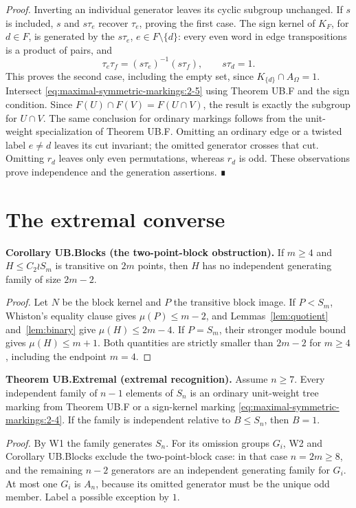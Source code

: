\emph{Proof.} Inverting an individual generator leaves its cyclic subgroup unchanged. If \(s\) is included, \(s\) and \(s\tau_e\) recover \(\tau_e\), proving the first case. The sign kernel of \(K_F\), for \(d\in F\), is generated by the \(s\tau_e\), \(e\in F\setminus\{d\}\): every even word in edge transpositions is a product of pairs, and \[
\tau_e\tau_f=(s\tau_e)^{-1}(s\tau_f),\qquad s\tau_d=1.
\] This proves the second case, including the empty set, since \(K_{\{d\}}\cap A_\Omega=1\). Intersect \eqref{eq:maximal-symmetric-markings:2-5} using Theorem UB.F and the sign condition. Since \(F(U)\cap F(V)=F(U\cap V)\), the result is exactly the subgroup for \(U\cap V\). The same conclusion for ordinary markings follows from the unit-weight specialization of Theorem UB.F. Omitting an ordinary edge or a twisted label \(e\ne d\) leaves its cut invariant; the omitted generator crosses that cut. Omitting \(r_d\) leaves only even permutations, whereas \(r_d\) is odd. These observations prove independence and the generation assertions. ∎
\section{The extremal converse}
\textbf{Corollary UB.Blocks (the two-point-block obstruction).}
If $m\geq4$ and $H\leq C_2\wr S_m$ is transitive on $2m$ points,
then $H$ has no independent generating family of size $2m-2$.
\begin{proof}
Let $N$ be the block kernel and $P$ the transitive block image.
If $P<S_m$, Whiston's equality clause gives $\mu(P)\leq m-2$,
and Lemmas~\ref{lem:quotient} and~\ref{lem:binary} give
$\mu(H)\leq2m-4$. If $P=S_m$, their stronger module bound gives
$\mu(H)\leq m+1$. Both quantities are strictly smaller than $2m-2$
for $m\geq4$, including the endpoint $m=4$.
\end{proof}

\textbf{Theorem UB.Extremal (extremal recognition).} Assume \(n\geq7\). Every independent family of \(n-1\) elements of \(S_n\) is an ordinary unit-weight tree marking from Theorem UB.F or a sign-kernel marking \eqref{eq:maximal-symmetric-markings:2-4}. If the family is independent relative to \(B\leq S_n\), then \(B=1\).

\emph{Proof.} By W1 the family generates \(S_n\). For its omission groups \(G_i\), W2 and Corollary UB.Blocks exclude the two-point-block case: in that case \(n=2m\geq8\), and the remaining \(n-2\) generators are an independent generating family for \(G_i\). At most one \(G_i\) is \(A_n\), because its omitted generator must be the unique odd member. Label a possible exception by \(1\).

